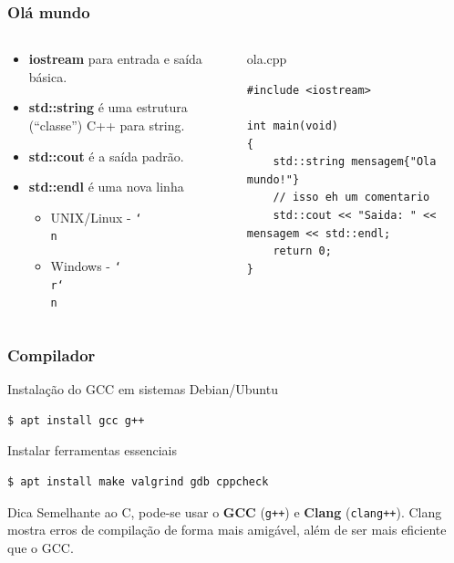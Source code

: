 \documentclass[xcolor={usenames,dvipsnames},10pt,presentation,aspectratio=169]{beamer}
\begin{document}
\begin{frame}[fragile]
  \frametitle{Olá mundo}
  \vspace{-2mm}
    \begin{columns}
      \begin{column}{0.5\textwidth}
          \begin{itemize}
          \item \textbf{iostream} para entrada e saída básica.
          \item \textbf{std::string} é uma estrutura (``classe'') C++ para string.
          \item \textbf{std::cout} é a saída padrão.
          \item \textbf{std::endl} é uma nova linha 
            \begin{itemize}
              \item UNIX/Linux - \texttt{\char`\\n}
              \item Windows - \texttt{\char`\\r\char`\\n}
            \end{itemize}
          \end{itemize}
     \end{column}
      \begin{column}{0.5\textwidth}
  \begin{block}{ola.cpp}
\begin{lstlisting}
#include <iostream>

int main(void)
{
    std::string mensagem{"Ola mundo!"}
    // isso eh um comentario
    std::cout << "Saida: " << mensagem << std::endl;
    return 0;
}
\end{lstlisting}
\end{block}
      \end{column}
    \end{columns}
%
%
\end{frame}
\begin{frame}[fragile]
  \frametitle{Compilador}
\begin{exampleblock}{Instalação do GCC em sistemas Debian/Ubuntu}
\begin{lstlisting}
$ apt install gcc g++
\end{lstlisting}
\end{exampleblock}
%
\begin{exampleblock}{Instalar ferramentas essenciais}
\begin{lstlisting}
$ apt install make valgrind gdb cppcheck 
\end{lstlisting}
\end{exampleblock}
%
\begin{alertblock}{Dica}
Semelhante ao C, pode-se usar o \textbf{GCC} (\texttt{g++}) e \textbf{Clang}
(\texttt{clang++}).
Clang mostra erros de compilação de forma mais amigável, além de ser mais 
eficiente que o GCC.
\end{alertblock}
\end{frame}
\end{document}
